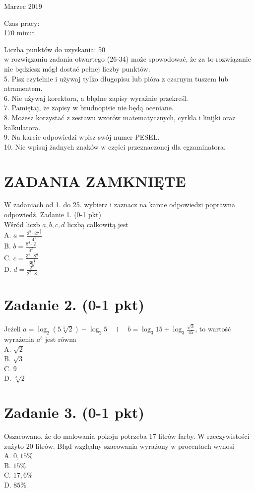 \documentclass[10pt]{article}
\begin{document}
Marzec 2019

Czas pracy:\\
170 minut

Liczba punktów do uzyskania: 50\\
w rozwiązaniu zadania otwartego (26-34) może spowodować, że za to rozwiązanie nie będziesz mógł dostać pełnej liczby punktów.\\
5. Pisz czytelnie i używaj tylko długopisu lub pióra z czarnym tuszem lub atramentem.\\
6. Nie używaj korektora, a błędne zapisy wyraźnie przekreśl.\\
7. Pamiętaj, że zapisy w brudnopisie nie będą oceniane.\\
8. Możesz korzystać z zestawu wzorów matematycznych, cyrkla i linijki oraz kalkulatora.\\
9. Na karcie odpowiedzi wpisz swój numer PESEL.\\
10. Nie wpisuj żadnych znaków w części przeznaczonej dla egzaminatora.

\section*{ZADANIA ZAMKNIĘTE}
W zadaniach od 1. do 25. wybierz i zaznacz na karcie odpowiedzi poprawna odpowiedź. Zadanie 1. (0-1 pkt)\\
Wśród liczb \(a, b, c, d\) liczbą całkowitą jest\\
A. \(a=\frac{2^{5} \cdot 27^{\frac{2}{3}}}{4^{9}}\)\\
B. \(b=\frac{8^{4} \cdot 2}{3^{2}}\)\\
C. \(c=\frac{3^{5} \cdot 8^{\frac{4}{3}}}{36^{\frac{1}{2}}}\)\\
D. \(d=\frac{2^{0}}{2^{2} \cdot 8}\)

\section*{Zadanie 2. (0-1 pkt)}
Jeżeli \(a=\log _{2}(5 \sqrt[3]{2})-\log _{2} 5 \quad\) i \(\quad b=\log _{3} 15+\log _{3} \frac{\sqrt{3}}{45}\), to wartość wyrażenia \(a^{b}\) jest równa\\
A. \(\sqrt{2}\)\\
B. \(\sqrt{3}\)\\
C. 9\\
D. \(\sqrt[3]{2}\)

\section*{Zadanie 3. (0-1 pkt)}
Oszacowano, że do malowania pokoju potrzeba 17 litrów farby. W rzeczywistości zużyto 20 litrów. Błąd względny szacowania wyrażony w procentach wynosi\\
A. \(0,15 \%\)\\
B. \(15 \%\)\\
C. \(17,6 \%\)\\
D. \(85 \%\)
\end{document}
